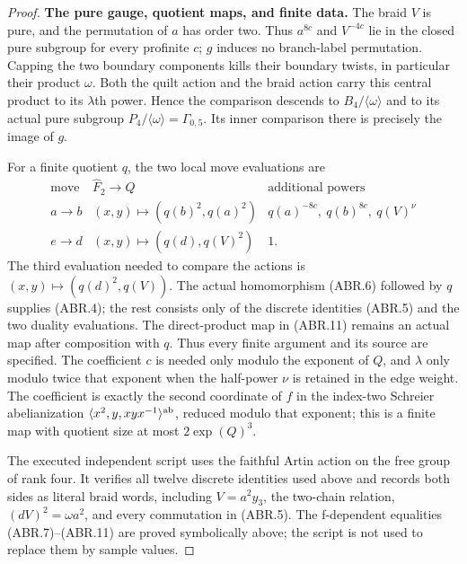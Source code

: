 \begin{proof}
\par\medskip\noindent\textbf{The pure gauge, quotient maps, and finite data.}\quad
The braid $V$ is pure, and the permutation of $a$ has order two.
Thus $a^{8c}$ and $V^{-4c}$ lie in the closed pure subgroup for
every profinite $c$; $g$ induces no branch-label permutation.
Capping the two boundary components kills their boundary twists,
in particular their product $\omega$.  Both the quilt action
and the braid action carry this central product to its
$\lambda$th power.  Hence the comparison descends to
$B_4/\langle\omega\rangle$ and to its actual pure subgroup
$P_4/\langle\omega\rangle=\Gamma_{0,5}$.
Its inner comparison there is precisely the image of $g$.

For a finite quotient $q$, the two local move evaluations are
\[
\begin{array}{c|c|c}
\text{move}&\widehat F_2\longrightarrow Q&\text{additional powers}\\ \hline
 a\to b&(x,y)\longmapsto(q(b)^2,q(a)^2)&q(a)^{-8c},\ q(b)^{8c},\ q(V)^\nu\\
 e\to d&(x,y)\longmapsto(q(d),q(V)^2)&1.
\end{array}                                                    \tag{ABR.12}
\]
The third evaluation needed to compare the actions is
$(x,y)\mapsto(q(d)^2,q(V))$.  The actual homomorphism
(ABR.6) followed by $q$ supplies (ABR.4); the rest consists only
of the discrete identities (ABR.5) and the two duality evaluations.
The direct-product map in (ABR.11) remains an actual map after
composition with $q$.  Thus every finite argument and its source
are specified.  The coefficient $c$ is needed only modulo the
exponent of $Q$, and $\lambda$ only modulo twice that exponent
when the half-power $\nu$ is retained in the edge weight.
The coefficient is exactly the second coordinate of $f$ in the
index-two Schreier abelianization
$\langle x^2,y,xyx^{-1}\rangle^{\rm ab}$, reduced modulo that
exponent; this is a finite map with quotient size at most
$2\exp(Q)^3$.

The executed independent script
uses the faithful Artin action on the free group of rank four.
It verifies all twelve discrete identities used above and
records both sides as literal braid words, including
$V=a^2y_3$, the two-chain relation, $(dV)^2=\omega a^2$,
and every commutation in (ABR.5).  The f-dependent equalities
(ABR.7)--(ABR.11) are proved symbolically above; the script is not
used to replace them by sample values.
\end{proof}
